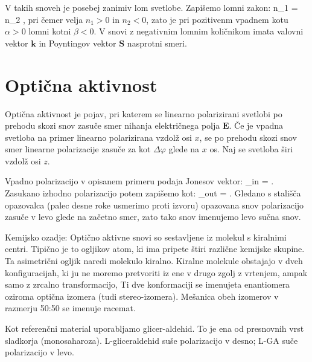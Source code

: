 V takih snoveh je posebej zanimiv lom svetlobe. Zapišemo lomni zakon:
\beq
n_1 \sin\alpha = n_2 \sin\beta,
\label{eq:09_39}
\eeq
pri čemer velja $n_1>0$ in $n_2<0$, zato je pri pozitivenm vpadnem kotu $\alpha >0$
lomni kotni $\beta <0$. V snovi z negativnim lomnim količnikom imata valovni vektor
$\mathbf{k}$ in Poyntingov vektor $\mathbf{S}$ nasprotni smeri.

\section{Optična aktivnost}
Optična aktivnost je pojav, pri katerem se linearno polarizirani svetlobi po prehodu
skozi snov zasuče smer nihanja električnega polja $\mathbf{E}$. Če je vpadna svetloba na primer
linearno polarizirana vzdolž osi $x$, se po prehodu skozi snov smer linearne polarizacije
zasuče za kot $\Delta \varphi$ glede na $x$ os. Naj se svetloba širi vzdolž osi $z$.

Vpadno polarizacijo v opisanem primeru podaja Jonesov vektor:
\beq
{}_{in} = 
\left[\begin{array}{c}
1\\
0\\
\end{array}\right]\!\!.
\label{eq:09_39}
\eeq
Zasukano izhodno polarizacijo potem zapišemo kot:
\beq
{}_{out} = 
\!\!.
\label{eq:09_40}
\eeq
Gledano s stališča opazovalca (palec desne roke usmerimo proti izvoru) opazovana
snov polarizacijo zasuče v levo glede na začetno smer, zato tako snov imenujemo
levo sučna snov. 

Kemijsko ozadje:
Optično aktivne snovi so sestavljene iz molekul s kiralnimi centri. Tipično je 
to ogljikov atom, ki ima pripete štiri različne kemijske skupine. Ta asimetrični
ogljik naredi molekulo kiralno. Kiralne molekule obstajajo v dveh konfiguracijah,
ki ju ne moremo pretvoriti iz ene v drugo zgolj z vrtenjem, ampak samo z zrcalno
transformacijo, Ti dve konformaciji se imenujeta enantiomera oziroma
optična izomera (tudi stereo-izomera). Mešanica obeh izomerov v razmerju 50:50
se imenuje racemat. 

Kot referenčni material uporabljamo glicer-aldehid. To je ena od presnovnih 
vrst sladkorja (monosaharoza). L-gliceraldehid suše polarizacijo v desno; L-GA
suče polarizacijo v levo. 

